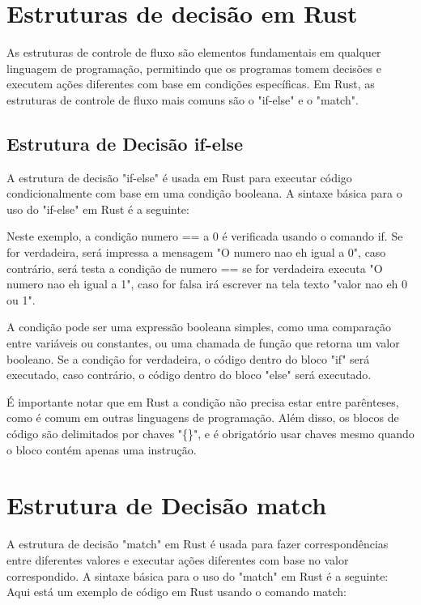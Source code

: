 \documentclass[12pt,a4paper,oneside]{abntex2}
\begin{document}
\section{Estruturas de decisão em Rust}

As estruturas de controle de fluxo são elementos fundamentais em qualquer linguagem de programação, permitindo que os programas tomem decisões e executem ações diferentes com base em condições específicas. Em Rust, as estruturas de controle de fluxo mais comuns são o "if-else" e o "match".

\subsection{Estrutura de Decisão if-else}

A estrutura de decisão "if-else" é usada em Rust para executar código condicionalmente com base em uma condição booleana. A sintaxe básica para o uso do "if-else" em Rust é a seguinte:



Neste exemplo, a condição numero == a 0 é verificada usando o comando if. Se for verdadeira, será impressa a mensagem "O numero nao eh igual a 0", caso contrário, será testa a condição de numero == se for verdadeira executa "O numero nao eh igual a 1", caso for falsa irá escrever na tela texto "valor nao eh 0 ou 1".

A condição pode ser uma expressão booleana simples, como uma comparação entre variáveis ou constantes, ou uma chamada de função que retorna um valor booleano. Se a condição for verdadeira, o código dentro do bloco "if" será executado, caso contrário, o código dentro do bloco "else" será executado.

É importante notar que em Rust a condição não precisa estar entre parênteses, como é comum em outras linguagens de programação. Além disso, os blocos de código são delimitados por chaves "\{\}", e é obrigatório usar chaves mesmo quando o bloco contém apenas uma instrução.

 

\section{Estrutura de Decisão match}

A estrutura de decisão "match" em Rust é usada para fazer correspondências entre diferentes valores e executar ações diferentes com base no valor correspondido. A sintaxe básica para o uso do "match" em Rust é a seguinte:
Aqui está um exemplo de código em Rust usando o comando match:

\end{document}
